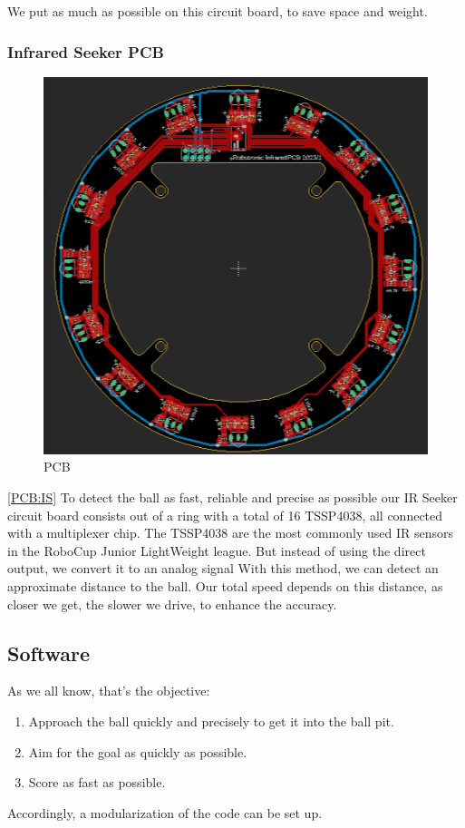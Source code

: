 We put as much as possible on this circuit board, to save space and weight.

\subsubsection{Infrared Seeker PCB}

\begin{figure}
    \centering
    \includegraphics[width=0.75\linewidth]{img/eagle/IrSeekerPCB.png}
    \caption{PCB}
    \label{fig:ISPCB}
\end{figure}

\ref{PCB:IS} To detect the ball as fast, reliable and precise as possible
our IR Seeker circuit board consists out of a ring with a total of 16 TSSP4038,
all connected with a multiplexer chip. 
\newline
The TSSP4038 are the most commonly used IR sensors in the RoboCup Junior LightWeight
league. But instead of using the direct output, we convert it to an analog signal
With this method, we can detect an approximate distance to the ball. Our total speed
depends on this distance, as closer we get, the slower we drive, to enhance the accuracy. 
\newline 

\subsection{Software} %
As we all know, that's the objective:
\begin{enumerate}
    \item{Approach the ball quickly and precisely to get it into the ball pit.}
    \item{Aim for the goal as quickly as possible.}
    \item{Score as fast as possible.}
\end{enumerate}
Accordingly, a modularization of the code can be set up.


